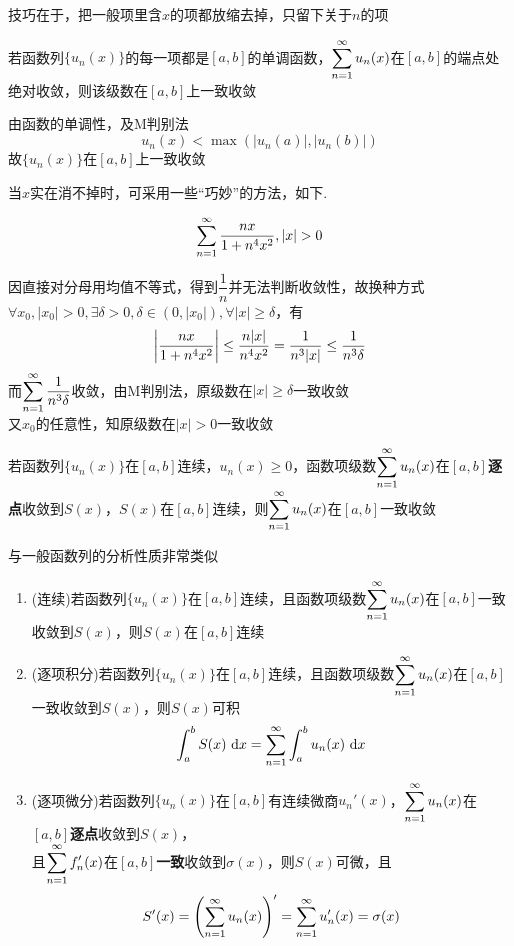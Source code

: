 \par 技巧在于，把一般项里含$x$的项都放缩去掉，只留下关于$n$的项
\begin{example}
若函数列$\{u_n(x)\}$的每一项都是$[a,b]$的单调函数，$\displaystyle\sum_{n=1}^{\infty}u_n(x)$在$[a,b]$的端点处绝对收敛，则该级数在$[a,b]$上一致收敛
\end{example}
\begin{analysis}由函数的单调性，及M判别法
\[u_n(x)<\max(|u_n(a)|,|u_n(b)|)\]
故$\{u_n(x)\}$在$[a,b]$上一致收敛
\end{analysis}
\par 当$x$实在消不掉时，可采用一些“巧妙”的方法，如下.
\begin{example}
\[\ssum{\dfrac{nx}{1+n^4x^2}},|x|>0\]
\end{example}
\begin{analysis}
因直接对分母用均值不等式，得到$\dfrac{1}{n}$并无法判断收敛性，故换种方式\\
$\forall x_0,|x_0|>0,\exists\delta>0,\delta\in(0,|x_0|),\forall|x|\geq\delta$，有
\[\left|\dfrac{nx}{1+n^4x^2}\right|\leq\dfrac{n|x|}{n^4x^2}=\dfrac{1}{n^3|x|}\leq\dfrac{1}{n^3\delta}\]
而$\displaystyle\sum_{n=1}^{\infty}\dfrac{1}{n^3\delta}$收敛，由M判别法，原级数在$|x|\geq\delta$一致收敛\\
又$x_0$的任意性，知原级数在$|x|>0$一致收敛
\end{analysis}
\begin{theorem}[迪尼(Dini)]
若函数列$\{u_n(x)\}$在$[a,b]$连续，$u_n(x)\geq 0$，函数项级数$\displaystyle\sum_{n=1}^{\infty}u_n(x)$在$[a,b]$\textbf{逐点}收敛到$S(x)$，$S(x)$在$[a,b]$连续，则$\displaystyle\sum_{n=1}^{\infty}u_n(x)$在$[a,b]$一致收敛
\end{theorem}
\begin{theorem}[和函数的分析性质]
\label{thm:sum_function_analysis_properties}
与一般函数列的分析性质非常类似
\begin{enumerate}
	\item (连续)若函数列$\{u_n(x)\}$在$[a,b]$连续，且函数项级数$\displaystyle\sum_{n=1}^{\infty}u_n(x)$在$[a,b]$一致收敛到$S(x)$，则$S(x)$在$[a,b]$连续
	\item (逐项积分)若函数列$\{u_n(x)\}$在$[a,b]$连续，且函数项级数$\displaystyle\sum_{n=1}^{\infty}u_n(x)$在$[a,b]$一致收敛到$S(x)$，则$S(x)$可积
	\[\displaystyle\int_{a}^{b}{S(x)}\,\,\mathrm{d} x=\displaystyle\sum_{n=1}^{\infty}\displaystyle\int_{a}^{b}{u_n(x)}\,\,\mathrm{d} x\]
	\item (逐项微分)若函数列$\{u_n(x)\}$在$[a,b]$有连续微商$u_n'(x)$，$\displaystyle\sum_{n=1}^{\infty}u_n(x)$在$[a,b]$\textbf{逐点}收敛到$S(x)$，\\
	且$\displaystyle\sum_{n=1}^{\infty}f_n'(x)$在$[a,b]$\textbf{一致}收敛到$\sigma(x)$，则$S(x)$可微，且
	\[\displaystyle S'(x)=\left(\displaystyle\sum_{n=1}^{\infty}u_n(x)\right)'=\displaystyle\sum_{n=1}^{\infty}u_n'(x)=\sigma(x)\]
\end{enumerate}
\end{theorem}
